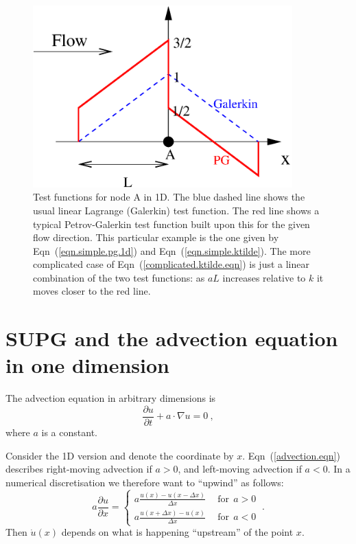 \documentclass[]{scrreprt}
\begin{document}
\begin{figure}[htb]
\centering
\includegraphics[width=10cm]{supg1D.eps}
\caption{Test functions for node A in 1D.  The blue dashed line shows the
  usual linear Lagrange (Galerkin) test function.  The red line shows
  a typical Petrov-Galerkin test function built upon this for the
  given flow direction.  This
  particular example is the one given by Eqn~(\ref{eqn.simple.pg.1d})
  and Eqn~(\ref{eqn.simple.ktilde}).  The more complicated case of
  Eqn~(\ref{complicated.ktilde.eqn}) is just a linear combination of
  the two test functions: as $aL$ increases relative to $k$ it moves
  closer to the red line.}
\label{supg1D.fig}
\end{figure}


\section{SUPG and the advection equation in one dimension}

The advection equation in arbitrary dimensions is
\begin{equation}
\frac{\partial u}{\partial t} + a\cdot\nabla u = 0 \ ,
\label{advection.eqn}
\end{equation}
where $a$ is a constant.

Consider the 1D version and denote the coordinate by $x$.
Eqn~(\ref{advection.eqn}) describes right-moving advection if $a>0$,
and left-moving advection if $a<0$.  In a numerical discretisation we
therefore want to ``upwind'' as follows:
\begin{equation}
a \frac{\partial u}{\partial x} = \left\{
\begin{array}{ll}
a \frac{u(x) - u(x-\Delta x)}{\Delta x} & \ \ \mbox{for}\ \ a>0 \\
a \frac{u(x+\Delta x) - u(x)}{\Delta x} & \ \ \mbox{for}\ \ a<0
\label{adv.upwinding.1d}
\end{array}
\right. \ .
\end{equation}
Then $\dot{u}(x)$ depends on what is happening ``upstream'' of the
point $x$.
\end{document}
